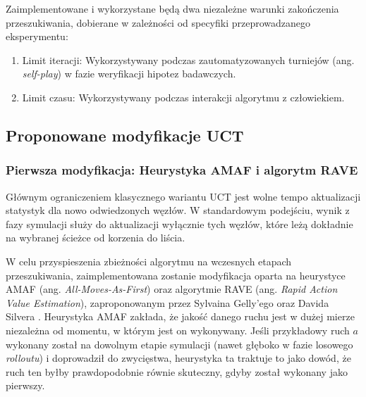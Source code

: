 \documentclass{article}
\begin{document}
Zaimplementowane i wykorzystane będą dwa niezależne warunki zakończenia przeszukiwania, dobierane w zależności od specyfiki przeprowadzanego eksperymentu:

\begin{enumerate}
    \item Limit iteracji: Wykorzystywany podczas zautomatyzowanych turniejów (ang. \textit{self-play}) w fazie weryfikacji hipotez badawczych.
    \item Limit czasu: Wykorzystywany podczas interakcji algorytmu z człowiekiem.
\end{enumerate}

\subsection{Proponowane modyfikacje UCT}
\subsubsection{Pierwsza modyfikacja: Heurystyka AMAF i algorytm RAVE}

Głównym ograniczeniem klasycznego wariantu UCT jest wolne tempo aktualizacji statystyk dla nowo odwiedzonych węzłów. W standardowym podejściu, wynik z fazy symulacji służy do aktualizacji wyłącznie tych węzłów, które leżą dokładnie na wybranej ścieżce od korzenia do liścia. 

W celu przyspieszenia zbieżności algorytmu na wczesnych etapach przeszukiwania, zaimplementowana zostanie modyfikacja oparta na heurystyce AMAF (ang. \textit{All-Moves-As-First}) oraz algorytmie RAVE (ang. \textit{Rapid Action Value Estimation}), zaproponowanym przez Sylvaina Gelly'ego oraz Davida Silvera \cite{gelly2007monte}. Heurystyka AMAF zakłada, że jakość danego ruchu jest w dużej mierze niezależna od momentu, w którym jest on wykonywany. Jeśli przykładowy ruch $a$ wykonany został na dowolnym etapie symulacji (nawet głęboko w fazie losowego \textit{rolloutu}) i doprowadził do zwycięstwa, heurystyka ta traktuje to jako dowód, że ruch ten byłby prawdopodobnie równie skuteczny, gdyby został wykonany jako pierwszy.
\end{document}
